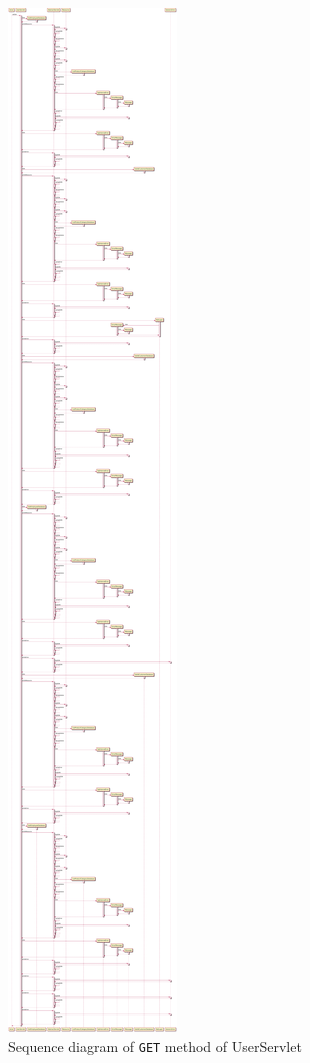 \begin{figure}[H]
    \centering
    \includegraphics[width=\textwidth,height=0.95\textheight,keepaspectratio]{Schemas/UserServlet_doGet.svg.pdf}
    \caption{Sequence diagram of \texttt{GET} method of UserServlet}
    \label{fig:UserServlet_doGet}
\end{figure}
